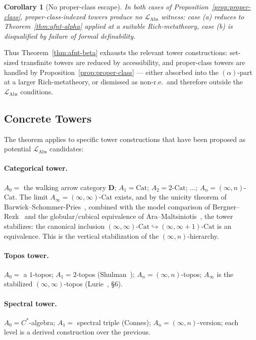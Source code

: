 \documentclass[11pt]{article}
\theoremstyle{plain}
\newtheorem{corollary}[theorem]{Corollary}
\theoremstyle{definition}
\newcommand{\LAbs}{\mathcal{L}_{\mathrm{Abs}}}
\newcommand{\Cat}{\mathrm{Cat}}
\begin{document}
\begin{corollary}[No proper-class escape]\label{cor:no-proper-class}
In both cases of Proposition~\ref{prop:proper-class}, proper-class-indexed towers produce no $\LAbs$ witness: case (a) reduces to Theorem~\ref{thm:afnt-alpha} applied at a suitable Rich-metatheory, case (b) is disqualified by failure of formal definability.
\end{corollary}

Thus Theorem~\ref{thm:afnt-beta} exhausts the relevant tower constructions: set-sized transfinite towers are reduced by accessibility, and proper-class towers are handled by Proposition~\ref{prop:proper-class} --- either absorbed into the $(\alpha)$-part at a larger Rich-metatheory, or dismissed as non-r.e.\ and therefore outside the $\LAbs$ conditions.

\subsection{Concrete Towers}

The theorem applies to specific tower constructions that have been proposed as potential $\LAbs$ candidates:

\paragraph{Categorical tower.} $A_0 = $ the walking arrow category $\mathbf{D}$; $A_1 = \Cat$; $A_2 = 2\text{-}\Cat$; $\ldots$; $A_n = (\infty, n)$-$\Cat$. The limit $A_\infty = (\infty, \infty)$-$\Cat$ exists, and by the unicity theorem of Barwick--Schommer-Pries~\cite{BarwickSchommerPries2021}, combined with the model comparison of Bergner--Rezk~\cite{BergnerRezk2013} and the globular/cubical equivalence of Ara--Maltsiniotis~\cite{AraMaltsiniotis2017}, the tower stabilizes: the canonical inclusion $(\infty, \infty)\text{-}\Cat \hookrightarrow (\infty, \infty+1)\text{-}\Cat$ is an equivalence. This is the vertical stabilization of the $(\infty, n)$-hierarchy.

\paragraph{Topos tower.} $A_0 = $ a $1$-topos; $A_1 = 2$-topos (Shulman~\cite{Shulman2008}); $A_n = (\infty, n)$-topos; $A_\infty$ is the stabilized $(\infty, \infty)$-topos (Lurie~\cite{LurieHTT}, \S 6).

\paragraph{Spectral tower.} $A_0 = C^*$-algebra; $A_1 = $ spectral triple (Connes); $A_n = (\infty, n)$-version; each level is a derived construction over the previous.
\end{document}
